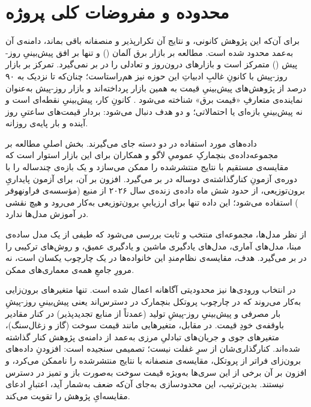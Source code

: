 
\section{محدوده و مفروضات کلی پروژه}

برای آن‌که این پژوهش کانونی، و نتایج آن تکرارپذیر و منصفانه باقی بماند، دامنه‌ی
آن به‌عمد محدود شده است. مطالعه بر بازار برق آلمان () و تنها بر افق
پیش‌بینیِ روز-پیش () متمرکز است و بازارهای درون‌روز و تعادلی را در
بر نمی‌گیرد. تمرکز بر بازار روز-پیش با کانونِ غالبِ ادبیاتِ این حوزه نیز هم‌راستاست؛ چنان‌که تا نزدیک به ۹۰ درصد از پژوهش‌های پیش‌بینیِ قیمت به همین بازار پرداخته‌اند و بازار روز-پیش به‌عنوان نماینده‌ی متعارفِ «قیمت برق» شناخته می‌شود \cite{jedrzejewski_electricity_2022}. کانونِ کار، پیش‌بینیِ نقطه‌ای است و نه پیش‌بینیِ بازه‌ای یا
احتمالاتی؛ و دو هدف دنبال می‌شود: بردار قیمت‌های ساعتیِ روز آینده و بار پایه‌ی
روزانه.

داده‌های مورد استفاده در دو دسته جای می‌گیرند. بخش اصلیِ مطالعه بر مجموعه‌داده‌ی
بنچمارکِ عمومیِ لاگو و همکاران \cite{lago_forecasting_2021} برای این بازار استوار
است که مقایسه‌ی مستقیم با نتایج منتشرشده را ممکن می‌سازد و یک بازه‌ی چندساله را
با دوره‌ی آزمونِ کنارگذاشته‌ی دوساله در بر می‌گیرد. افزون بر آن، برای آزمون
پایداریِ برون‌توزیعی، از حدود شش ماه داده‌ی زنده‌ی سال ۲۰۲۶ از منبع
 (مؤسسه‌ی فراونهوفر ) استفاده می‌شود؛ این داده تنها برای
ارزیابیِ برون‌توزیعی به‌کار می‌رود و هیچ نقشی در آموزش مدل‌ها ندارد.

از نظر مدل‌ها، مجموعه‌ای منتخب و ثابت بررسی می‌شود که طیفی از یک مدل ساده‌ی مبنا،
مدل‌های آماری، مدل‌های یادگیری ماشین و یادگیری عمیق، و روش‌های ترکیبی را در بر
می‌گیرد. هدف، مقایسه‌ی نظام‌مندِ این خانواده‌ها در یک چارچوب یکسان است، نه مرورِ
جامعِ همه‌ی معماری‌های ممکن.

در انتخاب ورودی‌ها نیز محدودیتی آگاهانه اعمال شده است. تنها متغیرهای برون‌زایی
به‌کار می‌روند که در چارچوب پروتکل بنچمارک در دسترس‌اند  یعنی پیش‌بینیِ
روز-پیشِ بار مصرفی و پیش‌بینیِ روز-پیشِ تولید (عمدتاً از منابع تجدیدپذیر) 
در کنار مقادیر باوقفه‌ی خودِ قیمت. در مقابل، متغیرهایی مانند قیمت سوخت (گاز و
زغال‌سنگ)، متغیرهای جوی و جریان‌های تبادلیِ مرزی به‌عمد از دامنه‌ی پژوهش کنار
گذاشته شده‌اند. کنارگذاری‌شان از سرِ غفلت نیست؛ تصمیمی سنجیده است: افزودنِ
داده‌های برون‌زای فراتر از پروتکل، مقایسه‌ی منصفانه با نتایج منتشرشده را ناممکن
می‌کرد، و افزون بر آن برخی از این سری‌ها  به‌ویژه قیمت سوخت  به‌صورت
باز و تمیز در دسترس نیستند. بدین‌ترتیب، این محدودسازی به‌جای آن‌که ضعف به‌شمار
آید، اعتبارِ ادعای مقایسه‌ایِ پژوهش را تقویت می‌کند.

